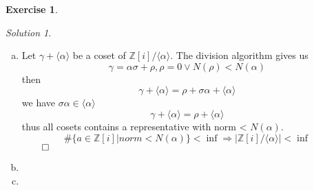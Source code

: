 \documentclass[a4paper,twoside=false,abstract=false,numbers=noenddot,
titlepage=false,headings=small,parskip=half,version=last]{scrartcl}
\theoremstyle{definition}
\newtheorem{exercise}{Exercise}
\theoremstyle{remark}
\newtheorem*{solution}{Solution}
\newcommand{\ZZ}{\ensuremath{\mathbb{Z}}}
\begin{document}
\begin{exercise}
{\bf
}
\end{exercise}
\begin{solution}

\begin{enumerate}[a)]
    \item 
        Let $\gamma + \langle \alpha \rangle$ be a coset of
        $\ZZ\left[i\right]/\langle \alpha \rangle$. The division algorithm
        gives us 
        \begin{equation}
            \gamma=\alpha\sigma + \rho,\rho=0 \vee N(\rho)<N(\alpha)
        \end{equation}
        then
        \begin{equation}
            \gamma+\langle\alpha\rangle=\rho+\sigma\alpha+\langle\alpha\rangle
        \end{equation}
        we have $\sigma\alpha\in\langle\alpha\rangle$
        \begin{equation}
            \gamma+\langle\alpha\rangle=\rho+\langle\alpha\rangle
        \end{equation}
        thus all cosets contains a representative with norm < $N(\alpha)$.
        \begin{equation}
            \#\{a\in\ZZ\left[i\right]|norm < N(\alpha)\}<\inf \Rightarrow
            |\ZZ\left[i\right] / \langle\alpha\rangle|<\inf
        \end{equation}
        $\qed$
    \item
        
    \item 

\end{enumerate}

\end{solution}

\end{document}
